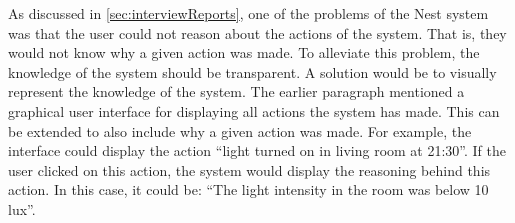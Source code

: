 As discussed in \cref{sec:interviewReports}, one of the problems of the Nest system was that the user could not reason about the actions of the system. That is, they would not know why a given action was made. To alleviate this problem, the knowledge of the system should be transparent. A solution would be to visually represent the knowledge of the system. The earlier paragraph mentioned a graphical user interface for displaying all actions the system has made. This can be extended to also include why a given action was made. For example, the interface could display the action \enquote{light turned on in living room at 21:30}. If the user clicked on this action, the system would display the reasoning behind this action. In this case, it could be: \enquote{The light intensity in the room was below 10 lux}.
